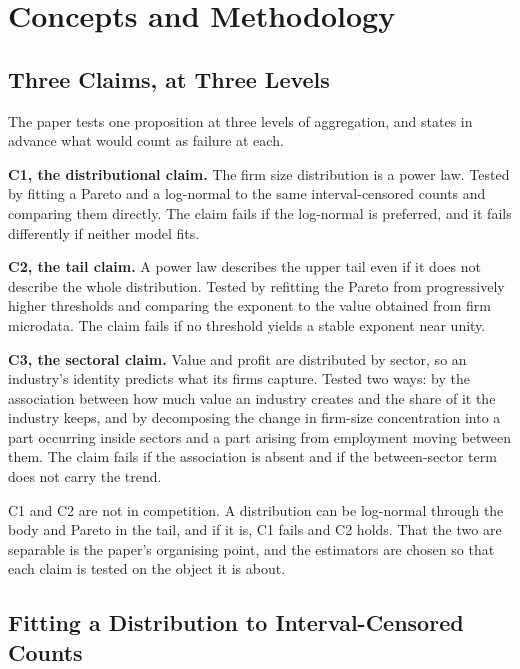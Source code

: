 \documentclass[jrfm,article,submit,pdftex,moreauthors]{Definitions/mdpi}
\begin{document}


\section{Concepts and Methodology}
\label{sec:method}

\subsection{Three Claims, at Three Levels}
\label{subsec:claims}

The paper tests one proposition at three levels of aggregation, and states in advance what
would count as failure at each.

\textbf{C1, the distributional claim.} The firm size distribution is a power law. Tested by
fitting a Pareto and a log-normal to the same interval-censored counts and comparing them
directly. The claim fails if the log-normal is preferred, and it fails differently if
neither model fits.

\textbf{C2, the tail claim.} A power law describes the upper tail even if it does not
describe the whole distribution. Tested by refitting the Pareto from progressively higher
thresholds and comparing the exponent to the value \citet{Axtell2001} obtained from firm
microdata. The claim fails if no threshold yields a stable exponent near unity.

\textbf{C3, the sectoral claim.} Value and profit are distributed by sector, so an
industry's identity predicts what its firms capture. Tested two ways: by the association
between how much value an industry creates and the share of it the industry keeps, and by
decomposing the change in firm-size concentration into a part occurring inside sectors and a
part arising from employment moving between them. The claim fails if the association is
absent and if the between-sector term does not carry the trend.

C1 and C2 are not in competition. A distribution can be log-normal through the body and
Pareto in the tail, and if it is, C1 fails and C2 holds. That the two are separable is the
paper's organising point, and the estimators are chosen so that each claim is tested on the
object it is about.

\subsection{Fitting a Distribution to Interval-Censored Counts}
\label{subsec:mle}
\end{document}
